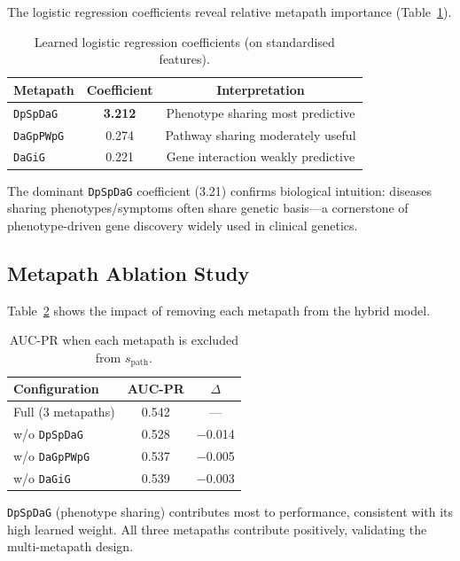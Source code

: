 \documentclass{article}
\begin{document}
The logistic regression coefficients reveal relative metapath importance (Table~\ref{tab:weights}).

\begin{table}[h]
\centering
\small
\caption{Learned logistic regression coefficients (on standardised features).}
\label{tab:weights}
\vspace{-0.5em}
\begin{tabular}{lcc}
\toprule
\textbf{Metapath} & \textbf{Coefficient} & \textbf{Interpretation} \\
\midrule
\texttt{DpSpDaG} & \textbf{3.212} & Phenotype sharing most predictive \\
\texttt{DaGpPWpG} & 0.274 & Pathway sharing moderately useful \\
\texttt{DaGiG} & 0.221 & Gene interaction weakly predictive \\
\bottomrule
\end{tabular}
\end{table}

The dominant \texttt{DpSpDaG} coefficient (3.21) confirms biological intuition: diseases sharing phenotypes/symptoms often share genetic basis---a cornerstone of phenotype-driven gene discovery widely used in clinical genetics.

\subsection{Metapath Ablation Study}

Table~\ref{tab:ablation} shows the impact of removing each metapath from the hybrid model.

\begin{table}[h]
\centering
\small
\caption{AUC-PR when each metapath is excluded from $s_\text{path}$.}
\label{tab:ablation}
\vspace{-0.5em}
\begin{tabular}{lcc}
\toprule
\textbf{Configuration} & \textbf{AUC-PR} & \textbf{$\Delta$} \\
\midrule
Full (3 metapaths)     & 0.542 & --- \\
w/o \texttt{DpSpDaG}   & 0.528 & $-$0.014 \\
w/o \texttt{DaGpPWpG}  & 0.537 & $-$0.005 \\
w/o \texttt{DaGiG}     & 0.539 & $-$0.003 \\
\bottomrule
\end{tabular}
\end{table}

\texttt{DpSpDaG} (phenotype sharing) contributes most to performance, consistent with its high learned weight. All three metapaths contribute positively, validating the multi-metapath design.
\end{document}
